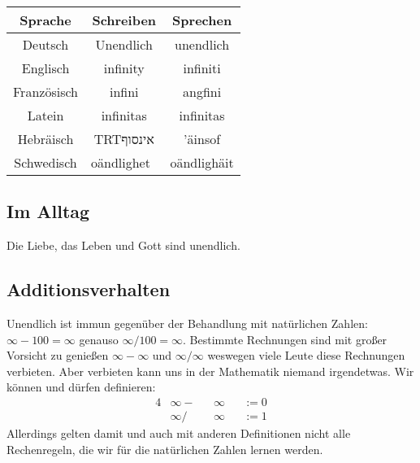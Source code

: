 \documentclass[a4paper]{amsart}
\newcommand{\texthebrew}[1]{\bgroup\textdir TRT\hebrewfont #1\egroup}
\theoremstyle{definition}
\begin{document}
\begin{tabular}{|c|c|c|}
   \hline
   \textbf{Sprache}& \textbf{Schreiben} & \textbf{Sprechen} \\
   \hline
   Deutsch     &Unendlich   &unendlich      \\
   \hline
   Englisch    &infinity   &infiniti      \\
   \hline
   Französisch &infini   &angfini      \\
   \hline
   Latein      &infinitas  &infinitas     \\
   \hline
   Hebräisch   &\texthebrew{אינסוף}    &'äinsof \\
   \hline
   Schwedisch  &oändlighet    &oändlighäit     \\
   \hline
\end{tabular}

\subsection{Im Alltag}
Die Liebe, das Leben und Gott sind unendlich.

\subsection{Additionsverhalten}
Unendlich ist immun gegenüber der Behandlung mit natürlichen Zahlen:
$\infty -100 = \infty$ genauso $\infty / 100 = \infty$. Bestimmte Rechnungen sind mit großer Vorsicht zu genießen $\infty - \infty$ und $\infty / \infty$ weswegen viele Leute diese Rechnungen verbieten. Aber verbieten kann uns in der Mathematik niemand irgendetwas. Wir können und dürfen definieren:
\begin{alignat}{4}
    &\infty - &&\infty &&:= 0\\
    &\infty / &&\infty &&:= 1
\end{alignat}
Allerdings gelten damit und auch mit anderen Definitionen nicht alle Rechenregeln, die wir für die natürlichen Zahlen lernen werden.

\end{document}
